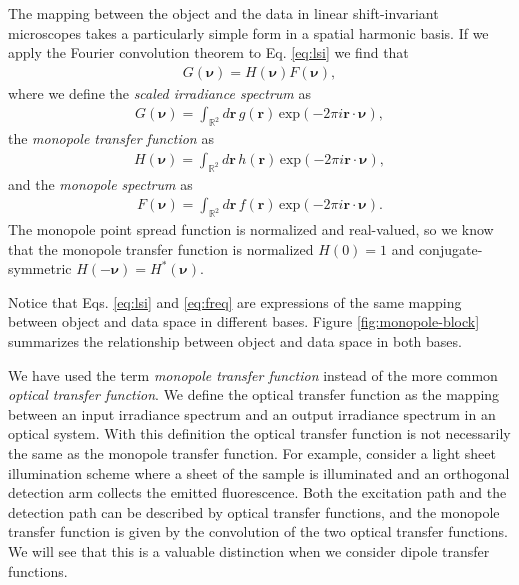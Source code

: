\documentclass[]{osa-article}
\providecommand{\mb}[1]{\mathbf{#1}}
\providecommand{\mbb}[1]{\mathbb{#1}}
\providecommand{\bs}[1]{\boldsymbol{#1}}
\providecommand{\bv}{\bs{\nu}}
\begin{document}
The mapping between the object and the data in linear shift-invariant
microscopes takes a particularly simple form in a spatial harmonic basis. If we
apply the Fourier convolution theorem to Eq. \ref{eq:lsi} we find that
\begin{align}
  G(\bv) = H(\bv)F(\bv),\label{eq:freq}
\end{align}
where we define the \textit{scaled irradiance spectrum} as
\begin{align}
  G(\bv) = \int_{\mbb{R}^2}d\mb{r}\, g(\mb{r})\, \text{exp}(-2\pi i\mb{r}\cdot\bv),
\end{align}
the \textit{monopole transfer function} as
\begin{align}
  H(\bv) = \int_{\mbb{R}^2}d\mb{r}\, h(\mb{r})\, \text{exp}(-2\pi i\mb{r}\cdot\bv),\label{eq:otf}
\end{align}
and the \textit{monopole spectrum} as
\begin{align}
    F(\bv) = \int_{\mbb{R}^2}d\mb{r}\, f(\mb{r})\, \text{exp}(-2\pi i\mb{r}\cdot\bv).
\end{align}
The monopole point spread function is normalized and real-valued, so we know
that the monopole transfer function is normalized $H(0) = 1$ and
conjugate-symmetric $H(-\bv) = H^*(\bv)$.

Notice that Eqs. \ref{eq:lsi} and \ref{eq:freq} are expressions of the same
mapping between object and data space in different bases. Figure
\ref{fig:monopole-block} summarizes the relationship between object and data
space in both bases.

We have used the term \textit{monopole transfer function} instead of the more
common \textit{optical transfer function}. We define the optical transfer
function as the mapping between an input irradiance spectrum and an output
irradiance spectrum in an optical system. With this definition the optical
transfer function is not necessarily the same as the monopole transfer function.
For example, consider a light sheet illumination scheme where a sheet of the
sample is illuminated and an orthogonal detection arm collects the emitted
fluorescence. Both the excitation path and the detection path can be described
by optical transfer functions, and the monopole transfer function is given by
the convolution of the two optical transfer functions. We will see that this is
a valuable distinction when we consider dipole transfer functions.
\end{document}
